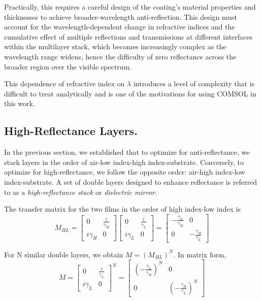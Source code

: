 Practically, this requires a careful design of the coating's material properties and thicknesses to achieve broader-wavelength anti-reflection. This design must account for the wavelength-dependent change in refractive indices and the cumulative effect of multiple reflections and transmissions at different interfaces within the multilayer stack, which becomes increasingly complex as the wavelength range widens, hence the difficulty of zero reflectance across the broader region over the visible spectrum.

This dependence of refractive index on $\lambda$ introduces a level of complexity that is difficult to treat analytically and is one of the motivations for using COMSOL in this work.

\subsection{High-Reflectance Layers.}
In the previous section, we established that to optimize for anti-reflectance, we stack layers in the order of air-low index-high index-substrate. Conversely, to optimize for high-reflectance, we follow the opposite order: air-high index-low index-substrate. A set of double layers designed to enhance reflectance is referred to as a \emph{high-reflectance stack} or \emph{dielectric mirror}.

The transfer matrix for the two films in the order of high index-low index is
    \[
      M_{HL} = 
            \begin{bmatrix}
            0 & \frac{i}{\gamma_H} \\
            i\gamma_H & 0
            \end{bmatrix}
            \begin{bmatrix}
            0 & \frac{i}{\gamma_L} \\
            i\gamma_L & 0
            \end{bmatrix} =
                    \begin{bmatrix}
                        -\frac{\gamma_L}{\gamma_H} & 0  \\
                        0 & -\frac{\gamma_H}{\gamma_L}
                    \end{bmatrix}
    \]
    
For N similar double layers, we obtain $M = (M_{HL})^N$. In matrix form,
    \[
      M = 
            \begin{bmatrix}
            0 & \frac{i}{\gamma_L} \\
            i\gamma_L & 0
            \end{bmatrix}^N =
                \begin{bmatrix}
                    \left(-\frac{\gamma_L}{\gamma_H}\right)^N & 0  \\
                    0 & \left(-\frac{\gamma_H}{\gamma_L}\right)^N
                \end{bmatrix}
    \]

